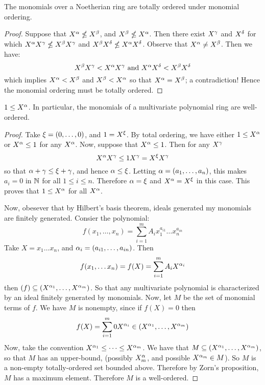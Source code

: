 \begin{proposition}\label{proposition_7.5.2}
  The monomials over a Noetherian ring are totally ordered under
  monomial ordering.
\end{proposition}
\begin{proof}
  Suppose that $X^\alpha \nleq X^\beta$, and $X^\beta \nleq X^\alpha$. Then there
  exist $X^\gamma$ and  $X^\delta$ for which  $X^\alpha X^\gamma \nleq X^\beta X^\gamma$ and
   $X^\beta X^\delta \nleq X^\alpha X^\delta$. Observe that $X^\alpha \neq X^\beta$.
   Then we have:
   \begin{equation*}
     X^\beta X^\gamma < X^\alpha X^\gamma \text{ and } X^\alpha X^\delta < X^\beta X^\delta
   \end{equation*}
   which implies $X^\alpha<X^\beta$ and $X^\beta < X^\alpha$ so that $X^\alpha=X^\beta$; a
   contradiction! Hence the monomial ordering must be totally ordered.
\end{proof}
\begin{corollary}
  $1 \leq X^\alpha$. In particular, the monomials of a multivariate
  polynomial ring are well-ordered.
\end{corollary}
\begin{proof}
  Take $\xi=(0, \dots, 0)$, and $1=X^\xi$. By total ordering, we have
  either $1 \leq X^\alpha$ or $X^\alpha \leq 1$ for any $X^\alpha$. Now, suppose
  that  $X^\alpha \leq 1$. Then for any $X^\gamma$
  \begin{equation*}
    X^\alpha X^\gamma \leq 1X^\gamma=X^\xi X^\gamma
  \end{equation*}
  so that $\alpha+\gamma \leq \xi+\gamma$, and hence $\alpha \leq \xi$. Letting
  $\alpha=(a_1, \dots, a_n)$, this makes $a_i=0$ in $\mathbb{N}$ for all
  $1 \leq i \leq n$. Therefore $\alpha=\xi$ and  $X^\alpha=X^\xi$ in this case.
  This proves that $1 \leq X^\alpha$ for all $X^\alpha$.

  Now, obesever that by Hilbert's basis theorem, ideals generated my
  monomials are finitely generated. Consier the polynomial:
  \begin{equation*}
    f(x_1, \dots, x_n)=\sum_{i=1}^m{A_ix_1^{a_{i1}} \dots x_n^{a_{in}}}
  \end{equation*}
  Take $X=x_1 \dots x_n$, and $\alpha_i=(a_{i1}, \dots, a_{in})$. Then
  \begin{equation*}
    f(x_1, \dots x_n)=f(X)=\sum_{i=1}^m{A_iX^{\alpha_i}}
  \end{equation*}
  then $(f) \subseteq (X^{\alpha_1}, \dots, X^{\alpha_m})$. So that any
  multivariate polynomial is characterized by an ideal finitely
  generated by monomials. Now, let $M$ be the set of monomial terms of
  $f$. We have $M$ is nonempty, since if $f(X)=0$ then
  \begin{equation*}
    f(X)=\sum_{i=1}^m{0X^{\alpha_i}} \in (X^{\alpha_1}, \dots, X^{\alpha_m})
  \end{equation*}
  Now, take the convention $X^{\alpha_1} \leq \dots \leq X^{\alpha_m}$. We
  have that $M \subseteq (X^{\alpha_1}, \dots, X^{\alpha_m})$, so that $M$ has
  an upper-bound, (possibly $X^\alpha_m$, and possible $X^{\alpha_m} \in M$).
  So $M$ is a non-empty totally-ordered set bounded above. Therefore
  by Zorn's proposition, $M$ has a maximum element. Therefore $M$ is a
  well-ordered.
\end{proof}

